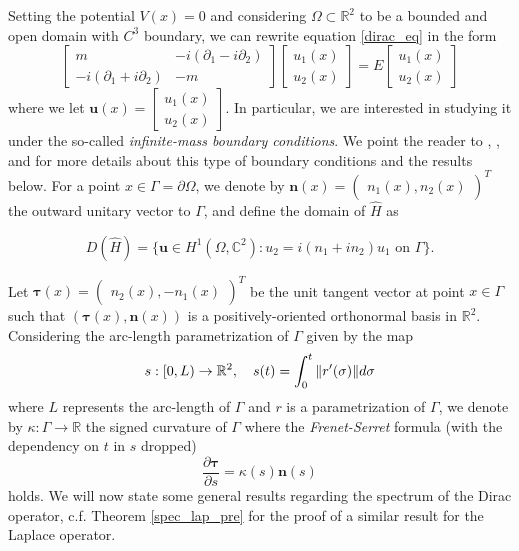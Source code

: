 Setting the potential \(V(x)=0\) and considering \(\Omega \subset \mathbb{R}^2\) to be a bounded and open domain with \(C^3\) boundary, we can rewrite equation \eqref{dirac_eq} in the form    
\begin{equation}\label{dirac}
    \begin{bmatrix}
        m & -i(\partial_1 - i \partial_2)\\
        -i(\partial_1 + i \partial_2) & -m
    \end{bmatrix}
    \begin{bmatrix}
        u_1(x)\\
        u_2(x)
    \end{bmatrix}
    =E
    \begin{bmatrix}
    u_1(x)\\
    u_2(x)
    \end{bmatrix}
\end{equation}
where we let \(\mathbf{u}(x)=\begin{bmatrix}
    u_1(x)\\
    u_2(x)
    \end{bmatrix}\).
In particular, we are interested in studying it under the so-called \textit{infinite-mass boundary conditions}. We point the reader to \cite{lotoreichik2019sharp}, \cite{briet2022spectral}, and \cite{antunes2021variational} for more details about this type of boundary conditions and the results below. For a point \(x \in \Gamma = \partial \Omega\), we denote by \(\mathbf{n}(x) = \begin{pmatrix}
    n_1(x), n_2(x)
\end{pmatrix}^T\) the outward unitary vector to \(\Gamma\), and define the domain of \(\hat{H}\) as

\[
D(\hat{H}) = \{\mathbf{u} \in H^1(\Omega, \mathbb{C}^2): u_2 = i(n_1+i n_2)u_1 \text{ on } \Gamma\}.
\]

Let \(\boldsymbol{\tau}(x) = \begin{pmatrix}
    n_2(x), -n_1(x)
\end{pmatrix}^T\) be the unit tangent vector at point \(x \in \Gamma\) such that \((\boldsymbol{\tau}(x), \mathbf{n}(x))\) is a positively-oriented orthonormal basis in \(\mathbb{R}^2\). Considering the arc-length parametrization of \(\Gamma\) given by the map
\[
s: [0, L) \rightarrow \mathbb{R}^2, \quad s(t) = \int_0^t \norm{r'(\sigma)} d\sigma
\]
where \(L\) represents the arc-length of \(\Gamma\) and \(r\) is a parametrization of \(\Gamma\), we denote by \(\kappa:\Gamma \rightarrow \mathbb{R}\) the signed curvature of \(\Gamma\) where the \textit{Frenet-Serret} formula (with the dependency on \(t\) in \(s\) dropped)
\begin{equation}\label{dirac_frenet_serret}
    \frac{\partial\boldsymbol{\tau}}{\partial s}=\kappa(s)\mathbf{n}(s)
\end{equation}
holds. We will now state some general results regarding the spectrum of the Dirac operator, c.f. Theorem \ref{spec_lap_pre} for the proof of a similar result for the Laplace operator.

